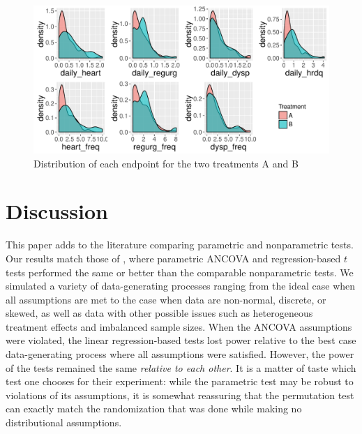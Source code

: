\documentclass[12pt]{article}
\begin{document}
\begin{figure}
\centering
\includegraphics[width = \textwidth]{fig/clinical_distr.pdf}
\caption{Distribution of each endpoint for the two treatments A and B}
\label{fig:clinical_distr}
\end{figure}


\begin{center}

\end{center}

\section{Discussion}

This paper adds to the literature comparing parametric and nonparametric tests.
Our results match those of \cite{vickers_parametric_2005, anderson_empirical_1999}, where parametric ANCOVA and regression-based $t$ tests performed the same or better than the comparable nonparametric tests.
We simulated a variety of data-generating processes ranging from the ideal case when all assumptions are met 
to the case when data are non-normal, discrete, or skewed,
as well as data with other possible issues such as heterogeneous treatment effects and imbalanced sample sizes.
When the ANCOVA assumptions were violated, the linear regression-based tests lost power relative to the best case data-generating process where all assumptions were satisfied.
However, the power of the tests remained the same \textit{relative to each other}.
It is a matter of taste which test one chooses for their experiment: while the parametric test may be robust to violations of its assumptions, it is somewhat reassuring that the permutation test can exactly match the randomization that was done while making no distributional assumptions.
\end{document}

